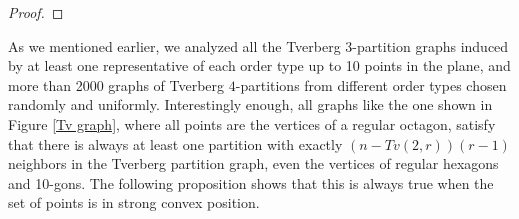 \documentclass[11pt,a4paper]{article}
\theoremstyle{plain}
\theoremstyle{definition}
\newcommand{\conv}{\operatorname{conv}}
\begin{document}
\begin{proof}
%
\end{proof}


As we mentioned earlier, we analyzed all the Tverberg $3$-partition graphs induced by at least one representative of each order type up to 10 points in the plane, and more than 2000 graphs of Tverberg $4$-partitions from different order types chosen randomly and uniformly.  Interestingly enough, all graphs like the one shown in Figure \ref{Tv graph},
where all points are the vertices of a regular octagon, satisfy that there is always at least one partition with exactly $(n-Tv(2,r))(r-1)$ neighbors in the Tverberg partition graph, even the vertices of regular hexagons and 10-gons. The following proposition shows that this is always true when the set of points is in strong convex position.
\end{document}

